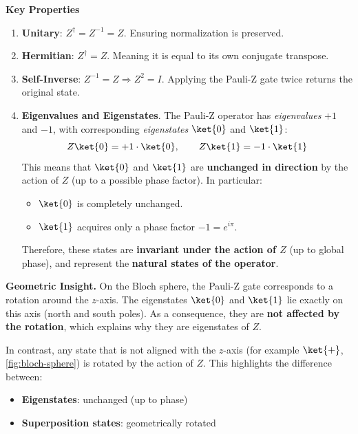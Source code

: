 \highspace
\begin{flushleft}
    \textcolor{Green3}{ \textbf{Key Properties}}
\end{flushleft}
\begin{enumerate}
    \item \textbf{Unitary}: $Z^{\dagger} = Z^{-1} = Z$. Ensuring normalization is preserved.
    \item \textbf{Hermitian}: $Z^{\dagger} = Z$. Meaning it is equal to its own conjugate transpose.
    \item \textbf{Self-Inverse}: $Z^{-1} = Z \Rightarrow Z^{2} = I$. Applying the Pauli-Z gate twice returns the original state.
    \item \textbf{Eigenvalues and Eigenstates}. The Pauli-Z operator has \emph{eigenvalues} $+1$ and $-1$, with corresponding \emph{eigenstates} $\ket{0}$ and $\ket{1}$:
    \begin{equation*}
        Z\ket{0} = +1 \cdot \ket{0}, \hspace{2em} Z\ket{1} = -1 \cdot \ket{1}
    \end{equation*}
    This means that $\ket{0}$ and $\ket{1}$ are \textbf{unchanged in direction} by the action of $Z$ (up to a possible phase factor). In particular:
    \begin{itemize}
        \item $\ket{0}$ is completely unchanged.
        \item $\ket{1}$ acquires only a phase factor $-1 = e^{i\pi}$.
    \end{itemize}
    Therefore, these states are \textbf{invariant under the action of $Z$} (up to global phase), and represent the \textbf{natural states of the operator}.
\end{enumerate}

\highspace
\textcolor{Green3}{ \textbf{Geometric Insight.}} On the Bloch sphere, the Pauli-Z gate corresponds to a rotation around the $z$-axis. The eigenstates $\ket{0}$ and $\ket{1}$ lie exactly on this axis (north and south poles). As a consequence, they are \textbf{not affected by the rotation}, which explains why they are eigenstates of $Z$.

\highspace
In contrast, any state that is not aligned with the $z$-axis (for example $\ket{+}$, \autoref{fig:bloch-sphere}) is rotated by the action of $Z$. This highlights the difference between:
\begin{itemize}
    \item \textbf{Eigenstates}: unchanged (up to phase)
    \item \textbf{Superposition states}: geometrically rotated
\end{itemize}